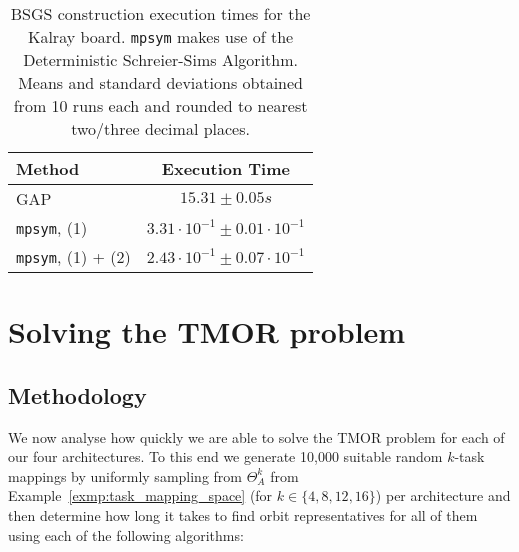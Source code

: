 \begin{table}[h!]
  \centering
  \begin{tabular}[t]{lc}
    \toprule
    Method                    & Execution Time \\
    \hline
    GAP                       & $15.31 \pm 0.05s$ \\
    \texttt{mpsym}, (1)       & $3.31 \cdot 10^{-1} \pm 0.01 \cdot 10^{-1}$ \\
    \texttt{mpsym}, (1) + (2) & $2.43 \cdot 10^{-1} \pm 0.07 \cdot 10^{-1}$ \\
    \bottomrule
  \end{tabular}
  \caption{BSGS construction execution times for the Kalray board.
           \texttt{mpsym} makes use of the Deterministic Schreier-Sims Algorithm.
           Means and standard deviations obtained from 10 runs each and
           rounded to nearest two/three decimal places.}
  \label{tab:bsgs_kalray}
\end{table}

\section{Solving the TMOR problem}
\label{sec:exp_repr}

\subsection{Methodology}
\label{sec:exp_repr_methodology}

We now analyse how quickly we are able to solve the TMOR problem for each of
our four architectures.  To this end we generate 10,000 suitable random
$k$-task mappings by uniformly sampling from $\Theta_A^k$ from
Example~\ref{exmp:task_mapping_space} (for $k \in \{4,8,12,16\}$) per
architecture and then determine how long it takes to find orbit representatives
for all of them using each of the following algorithms:

